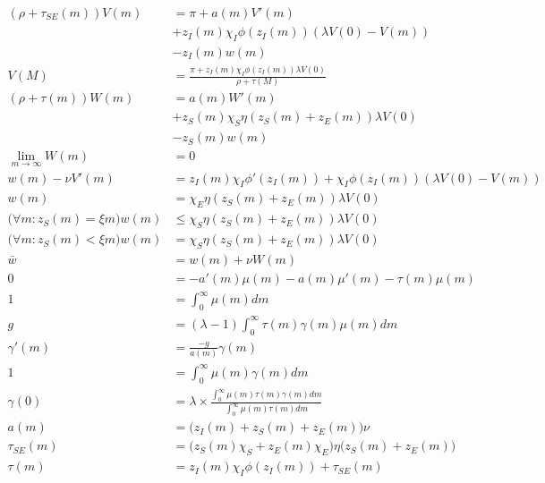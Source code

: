 \documentclass[12pt,english]{article}
\theoremstyle{remark}
\begin{document}
\begin{align}
(\rho + \tau_{SE}(m))V(m) &=  \pi + a(m) V'(m) \label{HJB_V}\\
						  &+ z_I(m)\chi_I \phi(z_I(m)) (\lambda V(0) - V(m)) \nonumber \\
						  &- z_I(m)w(m) \nonumber \\ 
 V(M) &= \frac{\pi + z_I(m)\chi_I \phi(z_I(m))\lambda V(0)}{\rho + \tau(M)} \label{HJB_V_Boundary} \\
(\rho + \tau(m)) W(m) &= a(m) W'(m) \label{HJB_W}\\
						&+ z_S(m)\chi_S\eta(z_S(m) + z_E(m))\lambda V(0) \nonumber \\
						&- z_S(m)w(m)  \nonumber	\\	
\lim_{m \to \infty} W(m) &= 0 \label{HJB_W_Boundary} \\ 										  
w(m) - \nu V'(m) &= z_I(m)\chi_I\phi'(z_I(m)) + \chi_I \phi(z_I(m)) (\lambda V(0) - V(m)) \label{HJB_V_FOC}\\
w(m) &= \chi_E\eta(z_S(m) + z_E(m)) \lambda V(0) \label{E_FreeEntry}\\ 
\Big(\forall m: z_S(m) = \xi m \Big) w(m) &\le \chi_S \eta(z_S(m) + z_E(m)) \lambda V(0) \label{HJB_W_Optimality1}\\
\Big(\forall m: z_S(m) < \xi m \Big) w(m) &= \chi_S \eta(z_S(m) + z_E(m)) \lambda V(0) \label{HJB_W_Optimality2}\\
\bar{w} &= w(m) + \nu W(m) \label{Indifference}\\
0 &= - a'(m)\mu(m) - a(m)\mu'(m) - \tau(m)\mu(m) \label{KF}\\
1 &= \int_{0}^{\infty} \mu(m) dm \label{KF_integral}\\
g &= (\lambda - 1) \int_{0}^{\infty} \tau(m) \gamma(m) \mu(m) dm \label{growth_aggregation} \\
\gamma'(m) &= \frac{-g }{a(m)} \gamma(m) \label{gamma_firstorder}\\
1 &= \int_{0}^{\infty} \mu(m) \gamma(m) dm \label{gamma_integral}\\ 
\gamma(0) &= \lambda \times \frac{\int_{0}^{\infty} \mu(m) \tau(m) \gamma(m)  dm}{\int_{0}^{\infty} \mu(m) \tau(m) dm} \label{gamma_consistency}\\
a(m) &= \big( z_I(m) + z_S(m) + z_E(m) \big) \nu \label{a_def}\\
\tau_{SE}(m) &= \big(z_S(m) \chi_S + z_E(m) \chi_E \big) \eta \big(z_S(m) + z_E(m)\big) \label{tau_SE_def}\\
\tau(m) &= z_I(m) \chi_I \phi(z_I(m)) + \tau_{SE}(m)  \label{tau_def}
\end{align}
\end{document}
